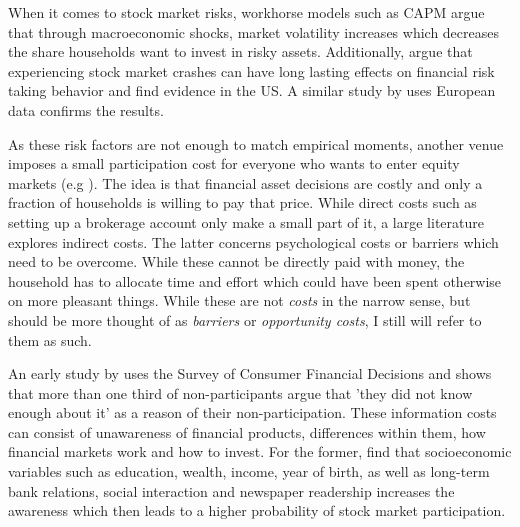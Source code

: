 \documentclass[ProjectABM]{subfiles}
\begin{document}
When it comes to stock market risks, workhorse models such as CAPM argue that through macroeconomic shocks, market volatility increases which decreases the share households want to invest in risky assets. Additionally, \cite{malmendier_2011} argue that experiencing stock market crashes can have long lasting effects on financial risk taking behavior and find evidence in the US. A similar study by \cite{ampudia_ehrmann_2017macroeconomic} uses European data confirms the results. 

As these risk factors are not enough to match empirical moments, another venue imposes a small participation cost for everyone who wants to enter equity markets (e.g \cite{vissing_2003, HM2003portfolio, GM2005portfolio}). The idea is that financial asset decisions are costly and only a fraction of households is willing to pay that price. While direct costs such as setting up a brokerage account only make a small part of it, a large literature explores indirect costs. The latter concerns psychological costs or barriers which need to be overcome. While these cannot be directly paid with money, the household has to allocate time and effort which could have been spent otherwise on more pleasant things. While these are not \textit{costs} in the narrow sense, but should be more thought of as \textit{barriers} or \textit{opportunity costs}, I still will refer to them as such.


An early study by \cite{king_leape_1987asset} uses the Survey of Consumer Financial Decisions and shows that more than one third of non-participants argue that 'they did not know enough about it' as a reason of their non-participation. These information costs can consist of unawareness of financial products, differences within them, how financial markets work and how to invest. %
For the former, \cite{guiso_jappelli_2005} find that socioeconomic variables such as education, wealth, income, year of birth, as well as long-term bank relations, social interaction and newspaper readership increases the awareness which then leads to a higher probability of stock market participation. 
\end{document}
